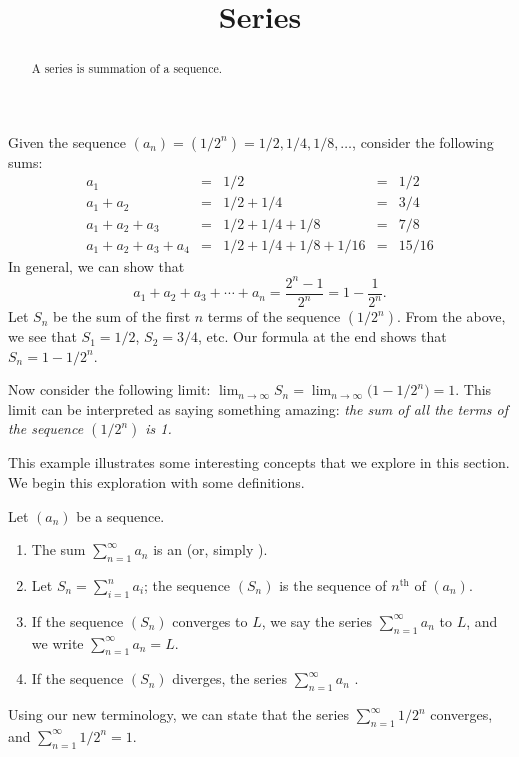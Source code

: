 \documentclass{ximera}
\title[Dig-In:]{Series}
\begin{document}
\begin{abstract}
A series is summation of a sequence.
\end{abstract}
\maketitle


Given the sequence $(a_n) = (1/2^n) = 1/2, 1/4, 1/8, \ldots$, consider
the following sums:
\[
\begin{array}{ccccc}
a_1				&=& 1/2					 &=& 1/2\\
a_1+a_2		&=& 1/2+1/4			 &=& 3/4\\
a_1+a_2+a_3 &=& 1/2+1/4+1/8  &=& 7/8\\
a_1+a_2+a_3+a_4 &=& 1/2+1/4+1/8+1/16 & =& 15/16
\end{array}
\]
In general, we can show that
\[
a_1+a_2+a_3+\cdots +a_n = \frac{2^n-1}{2^n} = 1-\frac{1}{2^n}.
\]
Let $S_n$ be the sum of the first $n$ terms of the sequence
$(1/2^n)$. From the above, we see that $S_1=1/2$, $S_2 = 3/4$,
etc. Our formula at the end shows that $S_n = 1-1/2^n$.

Now consider the following limit: $\lim_{n\to\infty}S_n =
\lim_{n\to\infty}\big(1-1/2^n\big) = 1$. This limit can be interpreted
as saying something amazing: \emph{the sum of \emph{all} the terms of
  the sequence $(1/2^n)$ is 1.}

This example illustrates some interesting concepts that we explore in
this section. We begin this exploration with some definitions.

\begin{definition}
Let $(a_n)$ be a sequence.
\begin{enumerate}
\item The sum $\sum_{n=1}^\infty a_n$ is an  (or,
  simply ).
\item Let $S_n = \sum_{i=1}^n a_i$; the sequence $(S_n)$ is the
  sequence of $n^\text{th}$  of $(a_n)$.
\item If the sequence $(S_n)$ converges to $L$, we say the series
  $\sum_{n=1}^\infty a_n$  to $L$, and we write
  $\sum_{n=1}^\infty a_n = L$.
\item If the sequence $(S_n)$ diverges, the series $\sum_{n=1}^\infty
  a_n$ .
\end{enumerate}
\end{definition}

Using our new terminology, we can state that the series
$\sum_{n=1}^\infty 1/2^n$ converges, and $\sum_{n=1}^\infty 1/2^n =
1.$
\end{document}

